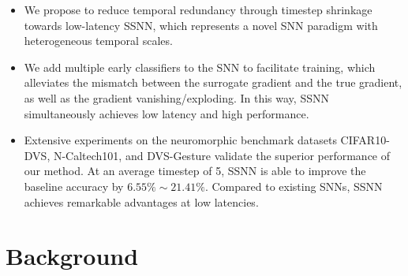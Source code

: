 \documentclass[letterpaper]{article} %
\begin{document}
\begin{itemize}
\item We propose to reduce temporal redundancy through timestep shrinkage towards low-latency SSNN, which represents a novel SNN paradigm with heterogeneous temporal scales.
\item We add multiple early classifiers to the SNN to facilitate training, which alleviates the mismatch between the surrogate gradient and the true gradient, as well as the gradient vanishing/exploding. In this way, SSNN simultaneously achieves low latency and high performance.
\item Extensive experiments on the neuromorphic benchmark datasets CIFAR10-DVS, N-Caltech101, and DVS-Gesture validate the superior performance of our method. At an average timestep of 5, SSNN is able to improve the baseline accuracy by $6.55\%\sim21.41\%$. Compared to existing SNNs, SSNN achieves remarkable advantages at low latencies.
\end{itemize}
\section{Background}
\label{Background}
\end{document}
